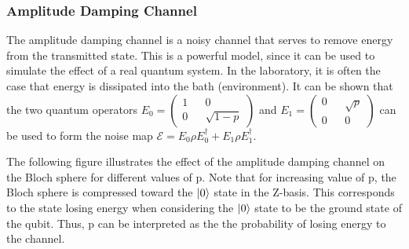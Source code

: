 \documentclass[letterpaper,twoside,10pt]{article}
\begin{document}
\subsubsection{Amplitude Damping Channel}

The amplitude damping channel is a noisy channel that serves to remove energy from the transmitted state. This is a powerful model, since it can be used to simulate the effect of a real quantum system. In the laboratory, it is often the case that energy is dissipated into the bath (environment). It can be shown that the two quantum operators $E_0 = \begin{pmatrix}1 && 0 \\ 0 && \sqrt{1-p}\end{pmatrix}$ and $E_1=\begin{pmatrix}0 && \sqrt{p} \\ 0 && 0\end{pmatrix}$ can be used to form the noise map $\mathcal{E}=E_0\rho E_0^\dagger+E_1\rho E_1^\dagger$. 

The following figure illustrates the effect of the amplitude damping channel on the Bloch sphere for different values of p. Note that for increasing value of p, the Bloch sphere is compressed toward the $\ket{0}$ state in the Z-basis. This corresponds to the state losing energy when considering the $\ket{0}$ state to be the ground state of the qubit. Thus, p can be interpreted as the the probability of losing energy to the channel.
\end{document}
